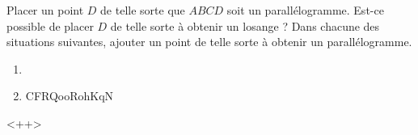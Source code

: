 
\begin{exercice}\label{exo2smath-0169}

    Placer un point \( D\) de telle sorte que \( ABCD\) soit un parallélogramme. Est-ce possible de placer \( D\) de telle sorte à obtenir un losange ?
    Dans chacune des situations suivantes, ajouter un point de telle sorte à obtenir un parallélogramme.
    \begin{multicols}{2}
    \begin{enumerate}
        \item
   
        \item
   
CFRQooRohKqN
    \end{enumerate}
    \end{multicols}
    <++>

\end{exercice}
